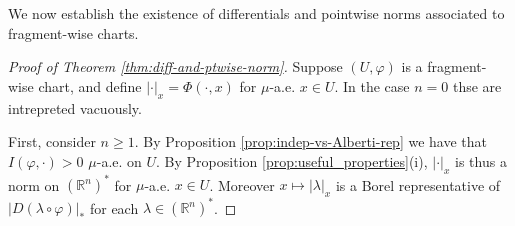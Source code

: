 \documentclass{amsart}
\numberwithin{equation}{section}
\newcommand{\R}{\mathbb{R}}
\begin{document}
We now establish the existence of differentials and pointwise norms associated to fragment-wise charts.

\begin{proof}[Proof of Theorem \ref{thm:diff-and-ptwise-norm}]
	Suppose $(U,\varphi)$ is a fragment-wise chart, and  define $|\cdot|_x=\Phi(\cdot,x)$ for $\mu$-a.e. $x\in U$. In the case $n=0$ thse are intrepreted vacuously. 
    
    First, consider $n\geq 1$. By Proposition \ref{prop:indep-vs-Alberti-rep} we have that $I(\varphi,\cdot)>0$ $\mu$-a.e. on $U$. By Proposition \ref{prop:useful_properties}(i), $|\cdot|_x$ is thus a norm on $(\R^n)^*$ for $\mu$-a.e. $x\in U$. Moreover $x\mapsto |\lambda|_x$ is a Borel representative of $|D(\lambda\circ\varphi)|_\ast$ for each $\lambda\in (\R^n)^*$.
	

\end{proof}
\end{document}
